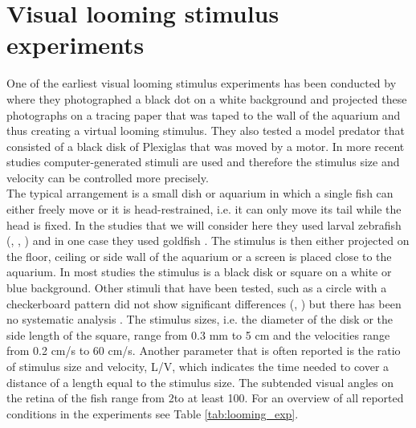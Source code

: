 \documentclass[a4paper,10pt,hidelinks]{scrreprt}
\begin{document}
	\section{Visual looming stimulus experiments}
	One of the earliest visual looming stimulus experiments has been conducted by 
	\cite{Dill1974} where they photographed a black dot on a white background and projected these 
	photographs on a tracing paper that was taped to the wall of the aquarium and thus creating a virtual looming stimulus.
	They also tested a model predator that consisted of a black disk of Plexiglas that was moved by a motor.
	In more recent studies computer-generated stimuli are used and therefore the stimulus size 
	and velocity can be controlled more precisely.\\
	The typical arrangement is a small dish or aquarium in which a single fish can either freely 
	move or it is head-restrained, i.e. it can only move its tail while the head is fixed. 
	In the studies that we will consider here they used larval zebrafish (\cite{Temizer2015}, 
	\cite{Dunn2016}, \cite{Bhattacharyya2017}) and in one case they used goldfish 
	\citep{Preuss2006}.
	The stimulus is then either projected on the floor, ceiling or side wall of the aquarium or a 
	screen is placed close to the aquarium.
	In most studies the stimulus is a black disk or square on a white or blue background.
	Other stimuli that have been tested, such as a circle with a checkerboard pattern did not show significant differences (\cite{Preuss2006}, \cite{Dunn2016}) but there has been no systematic analysis .
	The stimulus sizes, i.e. the diameter of the disk or the side length of the square, range from 0.3 mm to 5 cm and the velocities range from 0.2 cm/s to 60 cm/s.
    Another parameter that is often reported is the ratio of stimulus size and velocity, L/V, which indicates the time needed to cover a distance of a length equal to the stimulus size.
	The subtended visual angles on the retina of the fish range from 2\textdegree to at least 
	100\textdegree.
	For an overview of all reported conditions in the experiments see Table \ref{tab:looming_exp}.\\
\end{document}
